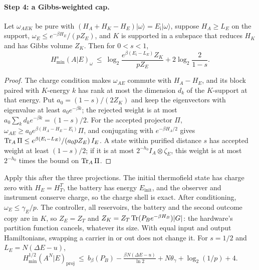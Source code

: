 \paragraph{Step 4: a Gibbs-weighted cap.}
\begin{lemma}\label{ar:lem:cap}
Let $\omega_{AEK}$ be pure with $(H_A+H_K-H_E)|\omega\rangle=E_{\mathrm i}|\omega\rangle$, suppose $H_A\ge L_E$ on the support, $\omega_E\le e^{-\beta H_E}/(pZ_E)$, and $K$ is supported in a subspace that reduces $H_K$ and has Gibbs volume $Z_K$. Then for $0<s<1$,
\[
H_{\min}^s(A|E)_\omega\ \le\ \log_2\frac{e^{\beta(E_{\mathrm i}-L_E)}Z_K}{pZ_E}+2\log_2\frac2{1-s}.
\]
\end{lemma}
\begin{proof}
The charge condition makes $\omega_{AE}$ commute with $H_A-H_E$, and its block paired with $K$-energy $k$ has rank at most the dimension $d_k$ of the $K$-support at that energy. Put $a_0=(1-s)/(2Z_K)$ and keep the eigenvectors with eigenvalue at least $a_0e^{-\beta k}$; the rejected weight is at most $a_0\sum_kd_ke^{-\beta k}=(1-s)/2$. For the accepted projector $\Pi$, $\omega_{AE}\ge a_0e^{\beta(H_A-H_E-E_{\mathrm i})}\Pi$, and conjugating with $e^{-\beta H_A/2}$ gives $\operatorname{Tr}_A\Pi\le e^{\beta(E_{\mathrm i}-L_E)}/(a_0pZ_E)\,I_E$. A state within purified distance $s$ has accepted weight at least $(1-s)/2$; if it is at most $2^{-h_0}I_A\otimes\zeta_E$, this weight is at most $2^{-h_0}$ times the bound on $\operatorname{Tr}_A\Pi$.
\end{proof}
Apply this after the three projections. The initial thermofield state has charge zero with $H_E=H_T^T$, the battery has energy $E_{\mathrm{init}}$, and the observer and instrument conserve charge, so the charge shell is exact. After conditioning, $\omega_E\le\gamma_E/p$. The controller, all reservoirs, the battery and the second outcome copy are in $K$, so $Z_E=Z_T$ and $Z_K=Z_T\operatorname{Tr}(P_Be^{-\beta H_B})|G|$: the hardware's partition function cancels, whatever its size. With equal input and output Hamiltonians, swapping a carrier in or out does not change it. For $s=1/2$ and $L_E=N(\Delta E-u)$,
\begin{equation}\label{ar:eq:cap}
H_{\min}^{1/2}(A^N|E)_{\mathrm{proj}}\ \le\ b_\beta(P_B)-\tfrac{\beta N(\Delta E-u)}{\ln2}+N\theta_\gamma+\log_2(1/p)+4.
\end{equation}

